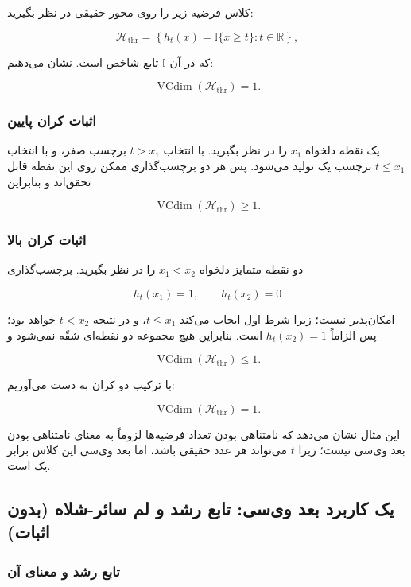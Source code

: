 \documentclass[12pt,a4paper]{article}
\begin{document}
کلاس فرضیه زیر را روی محور حقیقی در نظر بگیرید:

\[
\mathcal{H}_{\mathrm{thr}}
=
\left\{
 h_t(x)=\mathbb{I}\{x\geq t\}:t\in\mathbb{R}
\right\},
\]

که در آن $\mathbb{I}$ تابع شاخص است. نشان می‌دهیم:

\[
\boxed{\operatorname{VCdim}(\mathcal{H}_{\mathrm{thr}})=1.}
\]

\subsubsection{اثبات کران پایین}

یک نقطه دلخواه $x_1$ را در نظر بگیرید.
با انتخاب $t>x_1$ برچسب صفر، و با انتخاب
$t\leq x_1$ برچسب یک تولید می‌شود.
پس هر دو برچسب‌گذاری ممکن روی این نقطه
قابل تحقق‌اند و بنابراین

\[
\operatorname{VCdim}(\mathcal{H}_{\mathrm{thr}})\geq1.
\]

\subsubsection{اثبات کران بالا}

دو نقطه متمایز دلخواه $x_1<x_2$ را در نظر بگیرید.
برچسب‌گذاری

\[
h_t(x_1)=1,\qquad h_t(x_2)=0
\]

امکان‌پذیر نیست؛ زیرا شرط اول ایجاب می‌کند
$t\leq x_1$، و در نتیجه $t<x_2$ خواهد بود؛
پس الزاماً $h_t(x_2)=1$ است.
بنابراین هیچ مجموعه دو نقطه‌ای شقّه نمی‌شود و

\[
\operatorname{VCdim}(\mathcal{H}_{\mathrm{thr}})\leq1.
\]

با ترکیب دو کران به دست می‌آوریم:

\[
\boxed{\operatorname{VCdim}(\mathcal{H}_{\mathrm{thr}})=1.}
\]

این مثال نشان می‌دهد که نامتناهی بودن
تعداد فرضیه‌ها لزوماً به معنای نامتناهی بودن
بعد وی‌سی نیست؛ زیرا $t$ می‌تواند هر عدد حقیقی باشد،
اما بعد وی‌سی این کلاس برابر یک است.



\subsection{یک کاربرد بعد وی‌سی: تابع رشد و لم سائر-شلاه (بدون اثبات)}

\subsubsection{تابع رشد و معنای آن}
\end{document}
